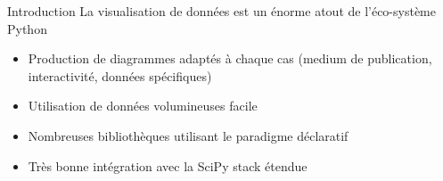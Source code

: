 \begin{frame}{Introduction}
  La visualisation de données est un énorme atout de l'éco-système Python

  \begin{itemize}
    \item Production de diagrammes adaptés à chaque cas (medium de publication, interactivité, données spécifiques)
    \item Utilisation de données volumineuses facile
    \item Nombreuses bibliothèques utilisant le paradigme déclaratif
    \item Très bonne intégration avec la SciPy stack étendue
  \end{itemize}
\end{frame}
